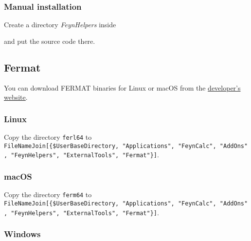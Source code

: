 \documentclass[../FeynHelpersManual.tex]{subfiles}
\begin{document}
\hypertarget{manual-installation}{%
\subsubsection{Manual installation}\label{manual-installation}}

Create a directory \emph{FeynHelpers} inside

\begin{Shaded}
\begin{Highlighting}[]
\OperatorTok{[\{}\OperatorTok{,} \OperatorTok{,} \OperatorTok{,} \OperatorTok{\}]}
\end{Highlighting}
\end{Shaded}

and put the source code there.

\hypertarget{fermat}{%
\subsection{Fermat}\label{fermat}}

You can download FERMAT binaries for Linux or macOS from the
\href{https://home.bway.net/lewis/zip.html}{developer's website}.

\hypertarget{linux}{%
\subsubsection{Linux}\label{linux}}

Copy the directory \texttt{ferl64} to
\texttt{FileNameJoin[\allowbreak{}\{\allowbreak{}\$UserBaseDirectory,\ \allowbreak{}"Applications",\ \allowbreak{}"FeynCalc",\ \allowbreak{}"AddOns",\ \allowbreak{}"FeynHelpers",\ \allowbreak{}"ExternalTools",\ \allowbreak{}"Fermat"\}]}.

\hypertarget{macos}{%
\subsubsection{macOS}\label{macos}}

Copy the directory \texttt{ferm64} to
\texttt{FileNameJoin[\allowbreak{}\{\allowbreak{}\$UserBaseDirectory,\ \allowbreak{}"Applications",\ \allowbreak{}"FeynCalc",\ \allowbreak{}"AddOns",\ \allowbreak{}"FeynHelpers",\ \allowbreak{}"ExternalTools",\ \allowbreak{}"Fermat"\}]}.

\hypertarget{windows}{%
\subsubsection{Windows}\label{windows}}
\end{document}
